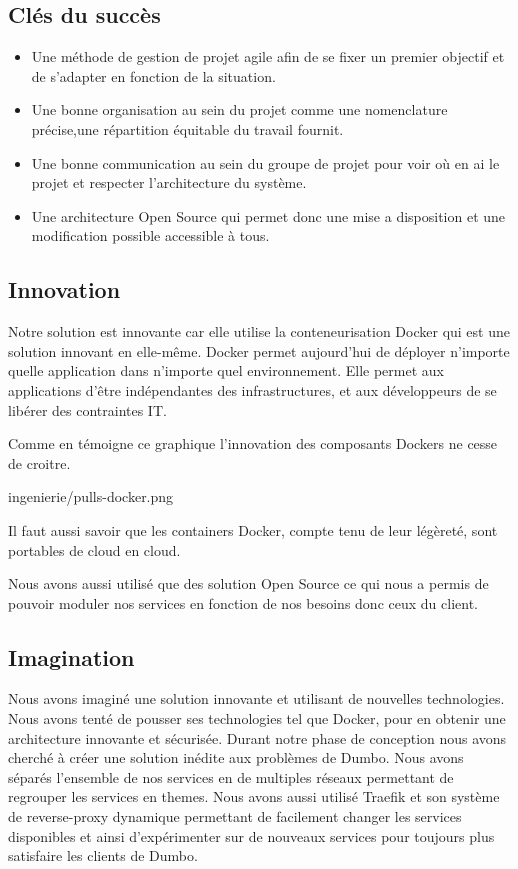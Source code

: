 \subsection{Clés du succès}

\begin{itemize}
\item Une méthode de gestion de projet agile afin de se fixer un premier objectif et de s'adapter en fonction de la situation.
\item Une bonne organisation au sein du projet comme une nomenclature précise,une répartition équitable du travail fournit.
\item Une bonne communication au sein du groupe de projet pour voir où en ai le projet et respecter l'architecture du système.
\item Une architecture Open Source qui permet donc une mise a disposition et une modification possible accessible à tous.
\end{itemize}

\clearpage

\subsection{Innovation}

Notre solution est innovante car elle utilise la conteneurisation Docker qui
est une solution innovant en elle-même. Docker permet aujourd'hui de
déployer n'importe quelle application dans n'importe quel environnement.
Elle permet aux applications d'être indépendantes des infrastructures,
et aux développeurs de se libérer des contraintes IT.

Comme en témoigne ce graphique l'innovation des composants Dockers ne
cesse de croitre.

\begin{figue}{1}{ingenierie/pulls-docker.png}
\caption{Évolution des composants téléchargés depuis \url{hub.docker.com}}
\end{figue}

Il faut aussi savoir que les containers Docker, compte tenu de
leur légèreté, sont portables de cloud en cloud.

Nous avons aussi utilisé que des solution Open Source ce qui nous a
permis de pouvoir moduler nos services en fonction de nos besoins donc
ceux du client.

\subsection{Imagination}

Nous avons imaginé une solution innovante et utilisant de nouvelles technologies.
Nous avons tenté de pousser ses technologies tel que Docker, pour en obtenir une architecture innovante et sécurisée.
Durant notre phase de conception nous avons cherché à créer une solution inédite aux problèmes de Dumbo.
Nous avons séparés l'ensemble de nos services en de multiples réseaux permettant de regrouper les services en themes.
Nous avons aussi utilisé Traefik et son système de reverse-proxy dynamique permettant de facilement changer les services disponibles et ainsi d'expérimenter sur de nouveaux services pour toujours plus satisfaire les clients de Dumbo.